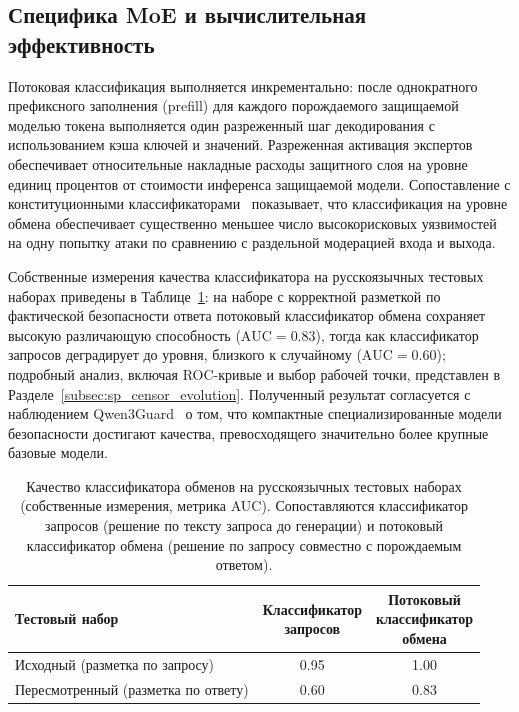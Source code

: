 \subsection{Специфика MoE и вычислительная эффективность}\label{subsec:sp_moe}

Потоковая классификация выполняется инкрементально: после однократного префиксного заполнения (prefill) для каждого порождаемого защищаемой моделью токена выполняется один разреженный шаг декодирования с использованием кэша ключей и значений.
Разреженная активация экспертов обеспечивает относительные накладные расходы защитного слоя на уровне единиц процентов от стоимости инференса защищаемой модели.
Сопоставление с конституционными классификаторами~\cite{sharma2025cc,cunningham2026ccpp} показывает, что классификация на уровне обмена обеспечивает существенно меньшее число высокорисковых уязвимостей на одну попытку атаки по сравнению с раздельной модерацией входа и выхода.

Собственные измерения качества классификатора на русскоязычных тестовых наборах приведены в Таблице~\ref{tab:sp_clf_quality}: на наборе с корректной разметкой по фактической безопасности ответа потоковый классификатор обмена сохраняет высокую различающую способность ($\mathrm{AUC} = 0.83$), тогда как классификатор запросов деградирует до уровня, близкого к случайному ($\mathrm{AUC} = 0.60$); подробный анализ, включая ROC-кривые и выбор рабочей точки, представлен в Разделе~\ref{subsec:sp_censor_evolution}.
Полученный результат согласуется с наблюдением Qwen3Guard~\cite{2510.14276} о том, что компактные специализированные модели безопасности достигают качества, превосходящего значительно более крупные базовые модели.

\begin{table}[H]
    \centering
    \caption{Качество классификатора обменов на русскоязычных тестовых наборах (собственные измерения, метрика AUC). Сопоставляются классификатор запросов (решение по тексту запроса до генерации) и потоковый классификатор обмена (решение по запросу совместно с порождаемым ответом).}
    \label{tab:sp_clf_quality}
    \begin{tabular}{lcc}
        \toprule
        Тестовый набор & \makecell{Классификатор\\запросов} & \makecell{Потоковый\\классификатор\\обмена} \\
        \midrule
        Исходный (разметка по запросу)        & 0.95 & 1.00 \\
        Пересмотренный (разметка по ответу)   & 0.60 & 0.83 \\
        \bottomrule
    \end{tabular}
\end{table}

